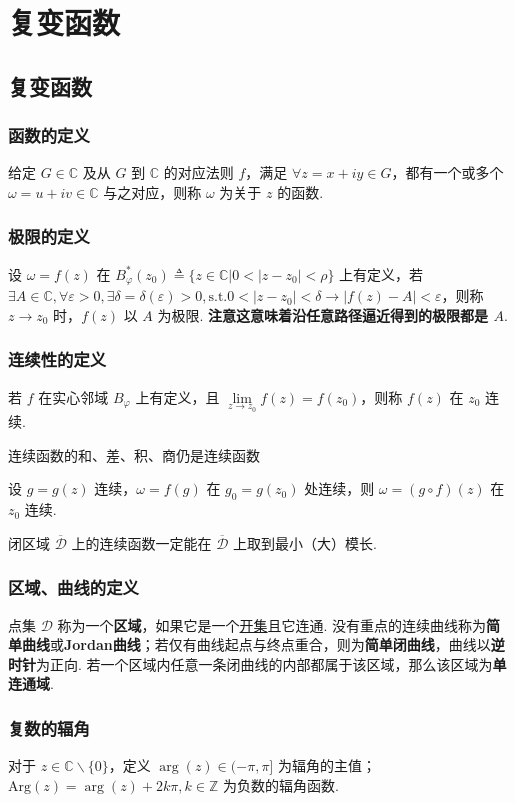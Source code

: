 \documentclass[./main.tex]{subfiles}
\begin{document}
\chapter{复变函数}
\section{复变函数}
\subsection{函数的定义}
给定 $G\in \mathbb{C}$ 及从 $G$ 到 $\mathbb{C}$ 的对应法则 $f$，满足 $\forall z=x+iy\in G$，都有一个或多个 $\omega=u+iv\in \mathbb{C}$ 与之对应，则称 $\omega$ 为关于 $z$ 的函数. 
\subsection{极限的定义}
设 $\omega=f(z)$  在 $B_{\varphi}^*(z_0)\triangleq \{z\in\mathbb{C}{\big|}0<|z-z_0|<\rho\}$ 上有定义，若 $\exists A\in \mathbb{C},\forall \varepsilon>0,\exists\delta=\delta(\varepsilon)>0,\text{s.t.} 0<|z-z_0|<\delta\rightarrow |f(z)-A|<\varepsilon$，则称 $z\rightarrow z_0$ 时，$f(z)$ 以 $A$ 为极限. \textbf{注意这意味着沿任意路径逼近得到的极限都是 $A$}. 
\subsection{连续性的定义}
若 $f$ 在实心邻域 $B_{\varphi}$ 上有定义，且 $\lim\limits_{z\rightarrow z_0}f(z)=f(z_0)$，则称 $f(z)$ 在 $z_0$ 连续. 
\begin{enumerate*}
    \item 连续函数的和、差、积、商仍是连续函数
    \item 设 $g=g(z)$ 连续，$\omega=f(g)$ 在 $g_0=g(z_0)$ 处连续，则 $\omega=(g\circ f)(z)$ 在 $z_0$ 连续. 
    \item 闭区域 $\overline{\mathscr{D}}$ 上的连续函数一定能在 $\overline{\mathscr{D}}$ 上取到最小（大）模长. 
\end{enumerate*}
\subsection{区域、曲线的定义}
点集 $\mathscr{D}$ 称为一个\textbf{区域}，如果它是一个\underline{开集}且它连通. 没有重点的连续曲线称为\textbf{简单曲线}或\textbf{Jordan曲线}；若仅有曲线起点与终点重合，则为\textbf{简单闭曲线}，曲线以\textbf{\color{red}逆时针}为正向. 若一个区域内任意一条闭曲线的内部都属于该区域，那么该区域为\textbf{单连通域}. 
\subsection{复数的辐角}
对于 $z\in\mathbb{C}\backslash\{0\}$，定义 {\color{red}$\arg(z)\in (-\pi,\pi]$} 为辐角的主值；$\text{Arg}(z)=\arg(z)+2k\pi,k\in\mathbb{Z}$ 为负数的辐角函数. 
\end{document}
